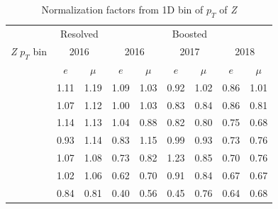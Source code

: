 \begin{table}
  \caption{Normalization factors from 1D bin of \( p_T \) of \textit{Z}}
  \centering
  \begin{tabular}{lcccccccc}
    \toprule
                           & \multicolumn{2}{c}{Resolved} & \multicolumn{6}{c}{Boosted}                                                                                                   \\
    \cmidrule(lr){2-9}
    \textit{Z} \(p_T\) bin & \multicolumn{2}{c}{2016}     & \multicolumn{2}{c}{2016}    & \multicolumn{2}{c}{2017} & \multicolumn{2}{c}{2018}                                             \\
    \midrule
                           & \( e \)                      & \( \mu \)                   & \( e \)                  & \( \mu \)                & \( e \) & \( \mu \) & \( e \) & \( \mu \) \\
    \cmidrule(lr){2-9}\relax
    [0, 80]                & 1.11                         & 1.19                        & 1.09                     & 1.03                     & 0.92    & 1.02      & 0.86    & 1.01      \\\relax
    [80, 160]              & 1.07                         & 1.12                        & 1.00                     & 1.03                     & 0.83    & 0.84      & 0.86    & 0.81      \\\relax
    [160, 240]             & 1.14                         & 1.13                        & 1.04                     & 0.88                     & 0.82    & 0.80      & 0.75    & 0.68      \\\relax
    [240, 320]             & 0.93                         & 1.14                        & 0.83                     & 1.15                     & 0.99    & 0.93      & 0.73    & 0.76      \\\relax
    [320, 400]             & 1.07                         & 1.08                        & 0.73                     & 0.82                     & 1.23    & 0.85      & 0.70    & 0.76      \\\relax
    [400, 480]             & 1.02                         & 1.06                        & 0.62                     & 0.70                     & 0.91    & 0.84      & 0.67    & 0.67      \\\relax
    [480, inf]             & 0.84                         & 0.81                        & 0.40                     & 0.56                     & 0.45    & 0.76      & 0.64    & 0.68      \\
    \bottomrule
  \end{tabular}\label{tab:norm-factors}
\end{table}

